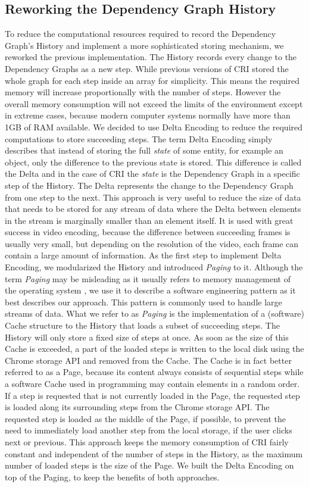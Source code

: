 \subsection{Reworking the Dependency Graph History}
To reduce the computational resources required to record the Dependency Graph's History and implement a more sophisticated storing mechanism, we reworked the previous implementation. The History records every change to the Dependency Graphs as a new step. While previous versions of CRI stored the whole graph for each step inside an array for simplicity. This means the required memory will increase proportionally with the number of steps. However the overall memory consumption will not exceed the limits of the environment except in extreme cases, because modern computer systems normally have more than 1GB of RAM available. We decided to use Delta Encoding to reduce the required computations to store succeeding steps. The term Delta Encoding simply describes that instead of storing the full \emph{state} of some entity, for example an object, only the difference to the previous state is stored. This difference is called the Delta and in the case of CRI the \emph{state} is the Dependency Graph in a specific step of the History. The Delta represents the change to the Dependency Graph from one step to the next. This approach is very useful to reduce the size of data that needs to be stored for any stream of data where the Delta between elements in the stream is marginally smaller than an element itself. It is used with great success in video encoding, because the difference between succeeding frames is usually very small, but depending on the resolution of the video, each frame can contain a large amount of information.
As the first step to implement Delta Encoding, we modularized the History and introduced \emph{Paging} to it. Although the term \emph{Paging} may be misleading as it usually refers to memory management of the operating system \cite{PagingWiki}, we use it to describe a software engineering pattern as it best describes our approach. This pattern is commonly used to handle large streams of data. What we refer to as \emph{Paging} is the implementation of a (software) Cache structure to the History that loads a subset of succeeding steps. The History will only store a fixed size of steps at once. As soon as the size of this Cache is exceeded, a part of the loaded steps is written to the local disk using the Chrome storage API and removed from the Cache. The Cache is in fact better referred to as a Page, because its content always consists of sequential steps while a software Cache used in programming may contain elements in a random order. If a step is requested that is not currently loaded in the Page, the requested step is loaded along its surrounding steps from the Chrome storage API. The requested step is loaded as the middle of the Page, if possible, to prevent the need to immediately load another step from the local storage, if the user clicks next or previous. This approach keeps the memory consumption of CRI fairly constant and independent of the number of steps in the History, as the maximum number of loaded steps is the size of the Page. We built the Delta Encoding on top of the Paging, to keep the benefits of both approaches.
